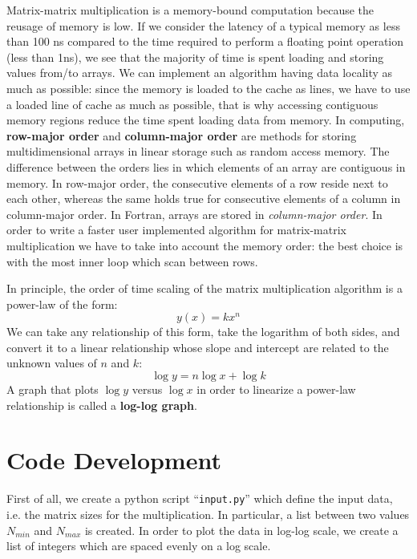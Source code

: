 \documentclass[rmp,10pt,onecolumn,fleqn,notitlepage]{revtex4-1}
\begin{document}
Matrix-matrix multiplication is a memory-bound computation because the reusage of memory is low.
If we consider the latency of a typical memory as less than 100 ns compared to the time required to perform a floating point operation (less than 1ns), we see that the majority of time is spent loading and storing values from/to arrays. We can implement an algorithm having data locality as much as possible: since the memory is loaded to the cache as lines, we have to use a loaded line of cache as much as possible, that is why accessing contiguous memory regions reduce the time spent loading data from memory.
In computing, \textbf{row-major order} and \textbf{column-major order} are methods for storing multidimensional arrays in linear storage such as random access memory.
The difference between the orders lies in which elements of an array are contiguous in memory. In row-major order, the consecutive elements of a row reside next to each other, whereas the same holds true for consecutive elements of a column in column-major order.
In Fortran, arrays are stored in \emph{column-major order}. In order to write a faster user implemented algorithm for matrix-matrix multiplication we have to take into account the memory order: the best choice is with the most inner loop which scan between rows.


In principle, the order of time scaling of the matrix multiplication algorithm is a power-law of the form:
\begin{equation}
  y (x) = k x^{n}
\end{equation}
We can take any relationship of this form, take the logarithm of both sides, and convert it to a linear relationship whose slope and intercept are related to the unknown values of $n$ and $k$:
\begin{equation}
  \log y = n \log x + \log k
\end{equation}
A graph that plots $\log y$ versus $\log x$ in order to linearize a power-law relationship is called a \textbf{log-log graph}.



\section{Code Development}

First of all, we create a python script “\texttt{input.py}” which define the input data, i.e. the matrix sizes for the multiplication. In particular, a list between two values \( N_{min} \) and \( N_{max} \) is created. In order to plot the data in log-log scale, we create a list of integers which are spaced evenly on a log scale.
\end{document}
